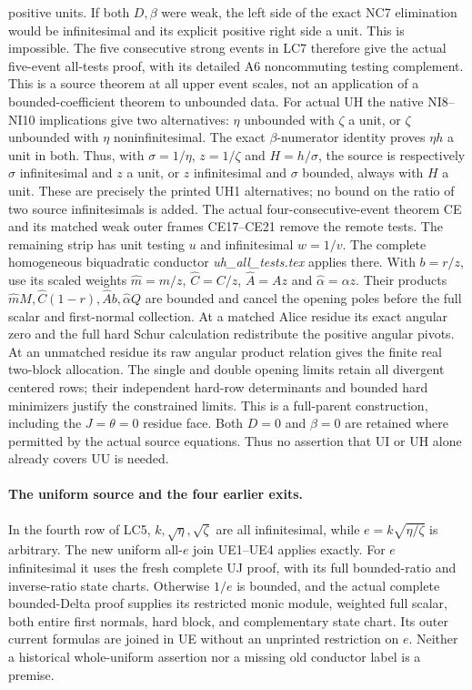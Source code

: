 positive units.  If both \(D,\beta\) were weak, the left side of
the exact NC7 elimination would be infinitesimal and its
explicit positive right side a unit.  This is impossible.
The five consecutive strong events in LC7 therefore give the
actual five-event all-tests proof, with its detailed A6
noncommuting testing complement.
This is a source theorem at all upper event scales, not an
application of a bounded-coefficient theorem to unbounded data.
For actual UH the native NI8--NI10 implications give two
alternatives: \(\eta\) unbounded with \(\zeta\) a unit, or
\(\zeta\) unbounded with \(\eta\) noninfinitesimal.
The exact \(\beta\)-numerator identity proves \(\eta h\) a
unit in both.  Thus, with \(\sigma=1/\eta\), \(z=1/\zeta\)
and \(H=h/\sigma\), the source is respectively
\(\sigma\) infinitesimal and \(z\) a unit, or \(z\)
infinitesimal and \(\sigma\) bounded, always with \(H\)
a unit.  These are precisely the printed UH1 alternatives;
no bound on the ratio of two source infinitesimals is added.
The actual four-consecutive-event theorem CE and its
matched weak outer frames CE17--CE21 remove the remote tests.
The remaining strip has unit testing \(u\) and infinitesimal
\(w=1/v\).  The complete homogeneous biquadratic conductor
\emph{uh\_all\_tests.tex} applies there.
With \(b=r/z\), use its scaled weights
\(\widehat m=m/z\), \(\widehat C=C/z\),
\(\widehat A=Az\) and \(\widehat\alpha=\alpha z\).
Their products
\(\widehat mM,\widehat C(1-r),\widehat A b,\widehat\alpha Q\)
are bounded and cancel the opening poles before the full
scalar and first-normal collection.
At a matched Alice residue its exact angular zero and
the full hard Schur calculation redistribute the positive
angular pivots.  At an unmatched residue its raw angular
product relation gives the finite real two-block allocation.
The single and double opening limits retain all divergent
centered rows; their independent hard-row determinants and
bounded hard minimizers justify the constrained limits.
This is a full-parent construction, including the
\(J=\theta=0\) residue face.
Both \(D=0\) and \(\beta=0\) are retained where permitted by the
actual source equations.  Thus no assertion that UI or UH alone
already covers UU is needed.

\paragraph{The uniform source and the four earlier exits.}
In the fourth row of LC5, \(k,\sqrt\eta,\sqrt\zeta\) are all
infinitesimal, while \(e=k\sqrt{\eta/\zeta}\) is arbitrary.
The new uniform all-\(e\) join UE1--UE4 applies exactly.
For \(e\) infinitesimal it uses the fresh complete UJ proof,
with its full bounded-ratio and inverse-ratio state charts.
Otherwise \(1/e\) is bounded, and the actual complete
bounded-Delta proof supplies its restricted monic module,
weighted full scalar, both entire first normals, hard block,
and complementary state chart.  Its outer current formulas
are joined in UE without an unprinted restriction on \(e\).
Neither a historical whole-uniform assertion nor a missing
old conductor label is a premise.

